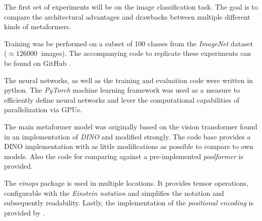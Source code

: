 The first set of experiments will be on the image classification task.
The goal is to compare the architectural advantages and drawbacks between multiple different kinds of metaformers.

Training was be performed on a subset of 100 classes from the \emph{ImageNet} dataset \cite{imagenetDataset} ($\approx \SI{126000}{}$ images).
The accompanying code to replicate these experiments can be found on GitHub \cite{selfComputerScience}.

The neural networks, as well as the training and evaluation code were written in python.
The \emph{PyTorch} \cite{pytorchGithub} machine learning framework was used as a measure to efficiently define neural networks and lever the computational capabilities of parallelization via GPUs.

The main metaformer model was originally based on the vision transformer found in an implementation of \emph{DINO} \cite{dinoGithub} and modified strongly.  
The code base provides a DINO implementation with as little modifications as possible to compare to own models.
Also the code for comparing against a pre-implemented \emph{poolformer} \cite{poolformerGithub} is provided.

The \emph{einops} package \cite{einopsGithub} is used in multiple locations.
It provides tensor operations, configurable with the \emph{Einstein notation} and simplifies the notation and subsequently readability.
Lastly, the implementation of the \emph{positional encoding} is provided by \cite{positionalEncodingGithub}.
